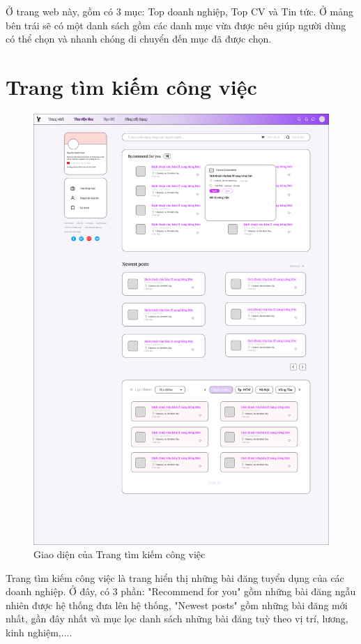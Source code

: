 Ở trang web này, gồm có 3 mục: Top doanh nghiệp, Top CV và Tin tức. Ở mảng bên trái sẽ có một danh sách gồm các danh mục vừa được nêu giúp người dùng có thể chọn và nhanh chóng di chuyển đến mục đã được chọn.


\section{Trang tìm kiếm công việc}

\begin{figure}[H]
\begin{center}
    \includegraphics[scale=0.2]{img/FindingJob.png}
    \caption{Giao diện của Trang tìm kiếm công việc}
\end{center}
\end{figure}

Trang tìm kiếm công việc là trang hiển thị những bài đăng tuyển dụng của các doanh nghiệp. Ở đây, có 3 phần: "Recommend for you" gồm những bài đăng ngẫu nhiên được hệ thống đưa lên hệ thống, "Newest posts" gồm những bài đăng mới nhất, gần đây nhất và mục lọc danh sách những bài đăng tuỳ theo vị trí, lương, kinh nghiệm,.... 


